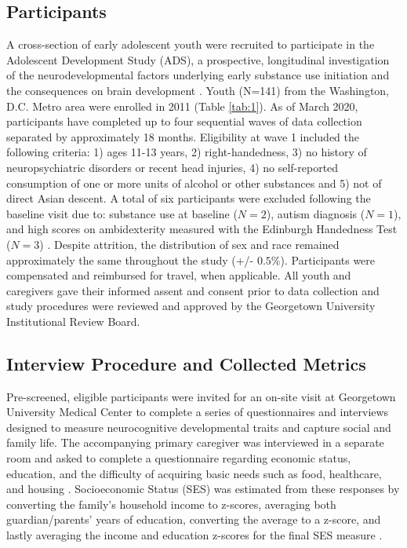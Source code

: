 \documentclass[utf8]{stylesheet}
\begin{document}
\subsection{Participants} 
A cross-section of early adolescent youth were recruited to participate in the Adolescent Development Study (ADS), a prospective, longitudinal investigation of the neurodevelopmental factors underlying early substance use initiation and the consequences on brain development \citep{Fishbein2016}. Youth (N=141) from the Washington, D.C. Metro area were enrolled in 2011 (Table \ref{tab:1}). As of March 2020, participants have completed up to four sequential waves of data collection separated by approximately 18 months. Eligibility at wave 1 included the following criteria: 1) ages 11-13 years, 2) right-handedness, 3) no history of neuropsychiatric disorders or recent head injuries, 4) no self-reported consumption of one or more units of alcohol or other substances and 5) not of direct Asian descent. A total of six participants were excluded following the baseline visit due to: substance use at baseline ($N=2$), autism diagnosis ($N=1$), and high scores on ambidexterity measured with the Edinburgh Handedness Test ($N=3$) \citep{veale2014edinburgh}. Despite attrition, the distribution of sex and race remained approximately the same throughout the study (+/- $0.5\%$). Participants were compensated and reimbursed for travel, when applicable. All youth and caregivers gave their informed assent and consent prior to data collection and study procedures were reviewed and approved by the Georgetown University Institutional Review Board. 
\subsection{Interview Procedure and Collected Metrics} Pre-screened, eligible participants were invited for an on-site visit at Georgetown University Medical Center to complete a series of questionnaires and interviews designed to measure neurocognitive developmental traits and capture social and family life. The accompanying primary caregiver was interviewed in a separate room and asked to complete a questionnaire regarding economic status, education, and the difficulty of acquiring basic needs such as food, healthcare, and housing \citep{bornstein2003socioeconomic}. Socioeconomic Status (SES) was estimated from these responses by converting the family’s household income to z-scores, averaging both guardian/parents' years of education, converting the average to a z-score, and lastly averaging the income and education z-scores for the final SES measure \citep{manuck2010ses}.
\end{document}
